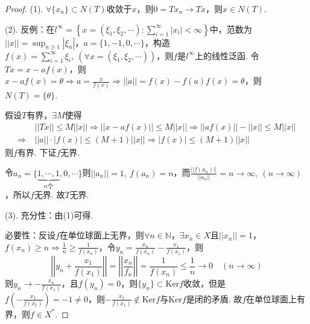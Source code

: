 \documentclass[12pt, a4paper, oneside]{ctexart}
\let\leq=\leqslant %
\let\geq=\geqslant %
\def\N{\mathbb{N}}          %
\def\ker{\mathrm{Ker}}      %
\begin{document}
\begin{proof}
    (1). $\forall \{x_n\}\subset N(T)$收敛于$x$，则$0=Tx_n\to Tx$，则$x\in N(T)$.

    (2). 反例：在$l^{\infty} = \left\{x=(\xi_1,\xi_2,\cdots):\sum_{i=1}^\infty|x_i| < \infty\right\}$中，范数为$||x|| = \sup_{n\geq 1}|\xi_n|$，$a=\{1,-1,0,\cdots\}$，构造$f(x) = \sum_{i=1}^\infty \xi_i,\ (\forall x=(\xi_1,\xi_2,\cdots))$，则$f$是$l^{\infty}$上的线性泛函. 令$Tx = x-af(x)$，则$x-af(x) = \theta\Rightarrow a = \frac{x}{f(x)}\Rightarrow ||a|| = f(x) - f(a)f(x) = \theta$，则$N(T) = \{\theta\}$.

    假设$T$有界，$\exists M$使得
    \begin{align*}
        &\ ||Tx||\leq M||x||\Rightarrow ||x-af(x)||\leq M||x||\Rightarrow ||af(x)||-||x||\leq M||x||\\
        \Rightarrow&\ ||a||\cdot |f(x)|\leq (M+1)||x||\Rightarrow |f(x)|\leq (M+1)||x||
    \end{align*}
    则$f$有界. 下证$f$无界.

    令$a_n = \{\underbrace{1,\cdots,1}_{n\text{个}},0,\cdots\}$则$||a_n|| = 1,\ f(a_n) = n$，而$\frac{||f(a_n)||}{||a_n||} = n\to\infty,\ (n\to\infty)$，所以$f$无界. 故$T$无界.

    (3). 充分性：由(1)可得.

    必要性：反设$f$在单位球面上无界，则$\forall n\in \N$，$\exists x_n\in X$且$||x_n|| = 1$，$f(x_n) \geq n\Rightarrow \frac{1}{n}\geq \frac{1}{f(x_n)}$，令$y_n = \frac{x_n}{f(x_n)} - \frac{x_1}{f(x_1)}$，则
    \begin{equation*}
        \left|\left|y_n+\frac{x_1}{f(x_1)}\right|\right| = \left|\left|\frac{x_n}{f_n}\right|\right| = \frac{1}{f(x_n)}\leq \frac{1}{n}\to 0\quad(n\to\infty)
    \end{equation*}
    则$y_n\to-\frac{x_n}{f(x_1)}$，且$f(y_n) = 0$，则$\{y_n\}\subset \ker f$收敛，但是$f(-\frac{x_1}{f(x_1)}) = -1\neq 0$，则$-\frac{x_1}{f(x_1)}\notin \ker f$与$\ker f$是闭的矛盾. 故$f$在单位球面上有界，则$f\in X^*$.
\end{proof}

\iffalse
\centerline{
    \texttt{[image: figure.png]}
}
\renewcommand\arraystretch{0.8} %
\begin{table}[!htbp] %
    \centering %
    \begin{tabular}{p{1cm}<{\centering}p{1cm}<{\centering}p{3cm}<{\centering}p{5cm}<{\centering}} %
        \toprule
        $x_i$ & $f[x_1]$ & $f[x_i,x_{i+1}]$ & $f[x_i,x_{i+1},x_{i+2}]$ \\
        \midrule
        $x_0$ & $f(x_0)$ &                  &                          \\
        $x_0$ & $f(x_0)$ & $f'(x_0)$        &                          \\
        $x_0$ & $f(x_1)$ & $\frac{f(x_1)-f(x_0)}{x_1-x_0}$ & $\frac{f(x_1)-f(x_0)}{(x_1-x_0)^2}-\frac{f'(x_0)}{x_1-x_0}$\\
        \bottomrule
    \end{tabular}
\end{table}

\def\Log{\text{Log}} %
$\Log$ %
\fi
\end{document}
